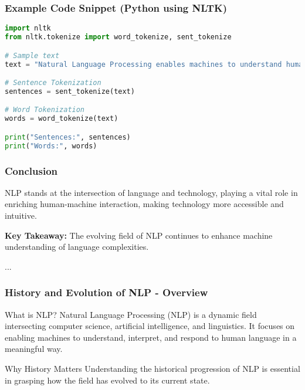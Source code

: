 \documentclass[aspectratio=169]{beamer}
\begin{document}
\begin{frame}[fragile]
    \frametitle{Example Code Snippet (Python using NLTK)}
    \begin{lstlisting}[language=Python]
import nltk
from nltk.tokenize import word_tokenize, sent_tokenize

# Sample text
text = "Natural Language Processing enables machines to understand human language."

# Sentence Tokenization
sentences = sent_tokenize(text)

# Word Tokenization
words = word_tokenize(text)

print("Sentences:", sentences)
print("Words:", words)
    \end{lstlisting}
\end{frame}

\begin{frame}
    \frametitle{Conclusion}
    NLP stands at the intersection of language and technology, playing a vital role in enriching human-machine interaction, making technology more accessible and intuitive.
    
    \textbf{Key Takeaway:} The evolving field of NLP continues to enhance machine understanding of language complexities.
\end{frame}

\begin{frame} ... \end{frame}

\begin{frame}[fragile]
    \frametitle{History and Evolution of NLP - Overview}
    \begin{block}{What is NLP?}
        Natural Language Processing (NLP) is a dynamic field intersecting computer science, artificial intelligence, and linguistics. It focuses on enabling machines to understand, interpret, and respond to human language in a meaningful way.
    \end{block}
    \begin{block}{Why History Matters}
        Understanding the historical progression of NLP is essential in grasping how the field has evolved to its current state.
    \end{block}
\end{frame}
\end{document}
